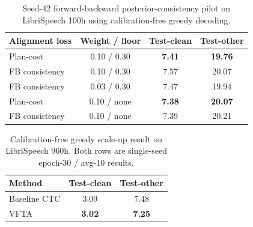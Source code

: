 \begin{table}[t]
  \centering
  \small
  \caption{Seed-42 forward-backward posterior-consistency pilot on
  LibriSpeech 100h using calibration-free greedy decoding.}
  \label{tab:libri100_fb_consistency}
  \begin{tabular}{lccc}
    \toprule
    Alignment loss & Weight / floor & Test-clean & Test-other \\
    \midrule
    Plan-cost & 0.10 / 0.30 & \textbf{7.41} & \textbf{19.76} \\
    FB consistency & 0.10 / 0.30 & 7.57 & 20.07 \\
    FB consistency & 0.03 / 0.30 & 7.47 & 19.94 \\
    Plan-cost & 0.10 / none & \textbf{7.38} & \textbf{20.07} \\
    FB consistency & 0.10 / none & 7.39 & 20.21 \\
    \bottomrule
  \end{tabular}
\end{table}

\begin{table}[t]
  \centering
  \small
  \caption{Calibration-free greedy scale-up result on LibriSpeech 960h.
  Both rows are single-seed epoch-30 / avg-10 results.}
  \label{tab:libri960_greedy}
  \begin{tabular}{lcc}
    \toprule
    Method & Test-clean & Test-other \\
    \midrule
    Baseline CTC & 3.09 & 7.48 \\
    VFTA & \textbf{3.02} & \textbf{7.25} \\
    \bottomrule
  \end{tabular}
\end{table}
